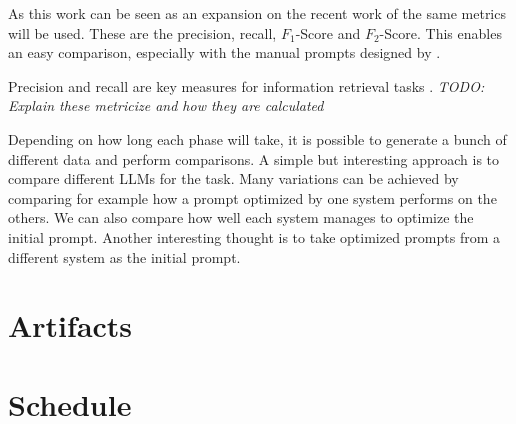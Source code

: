As this work can be seen as an expansion on the recent work of  the same metrics will be used. These are the precision, recall, $F_1$-Score and $F_2$-Score. This enables an easy comparison, especially with the manual prompts designed by .

Precision and recall are key measures for information retrieval tasks \cite{hayes2006advancing}. 
\textit{TODO: Explain these metricize and how they are calculated}

Depending on how long each phase will take, it is possible to generate a bunch of different data and perform comparisons.
A simple but interesting approach is to compare different LLMs for the task. Many variations can be achieved by comparing for example how a prompt optimized by one system performs on the others. We can also compare how well each system manages to optimize the initial prompt. 
Another interesting thought is to take optimized prompts from a different system as the initial prompt. 

\section{Artifacts}
\section{Schedule}
